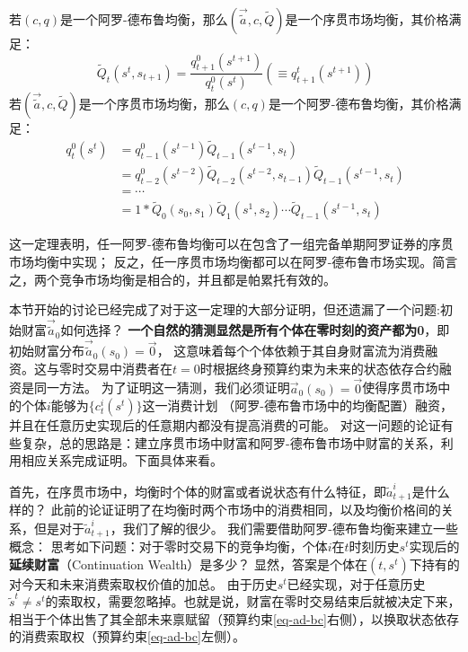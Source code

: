 \begin{theorem}
    若$\left(c,q\right)$是一个阿罗-德布鲁均衡，那么$(\vec{\tilde{a}},c,\tilde{Q})$是一个序贯市场均衡，其价格满足：
    \begin{equation}
        \tilde{Q}_t\left(s^t,s_{t+1}\right) = \frac{q_{t+1}^0\left(s^{t+1}\right)}{q_t^0\left(s^t\right)}
            (\equiv q_{t+1}^t\left(s^{t+1}\right))
    \end{equation}
    若$(\vec{\tilde{a}},c,\tilde{Q})$是一个序贯市场均衡，那么$\left(c,q\right)$是一个阿罗-德布鲁均衡，其价格满足：
    \begin{equation}
        \begin{aligned}
            q_{t}^0\left(s^{t}\right) &= q_{t-1}^0\left(s^{t-1}\right) \tilde{Q}_{t-1}\left(s^{t-1},s_{t}\right)  \\
                &= q_{t-2}^0\left(s^{t-2}\right)\tilde{Q}_{t-2}\left(s^{t-2},s_{t-1}\right)\tilde{Q}_{t-1}\left(s^{t-1},s_{t}\right) \\
                &= \cdots  \\
                &= 1*\tilde{Q}_0\left(s_0,s_1\right)\tilde{Q}_1\left(s^1,s_2\right)\cdots \tilde{Q}_{t-1}\left(s^{t-1},s_{t}\right)
        \end{aligned}
    \end{equation}
\end{theorem}

这一定理表明，任一阿罗-德布鲁均衡可以在包含了一组完备单期阿罗证券的序贯市场均衡中实现；
反之，任一序贯市场均衡都可以在阿罗-德布鲁市场实现。简言之，两个竞争市场均衡是相合的，并且都是帕累托有效的。

本节开始的讨论已经完成了对于这一定理的大部分证明，但还遗漏了一个问题:初始财富$\vec{\tilde{a}}_0$如何选择？
\textbf{一个自然的猜测显然是所有个体在零时刻的资产都为0}，即初始财富分布$\vec{\tilde{a}}_0\left(s_0\right)=\vec{0}$，
这意味着每个个体依赖于其自身财富流为消费融资。这与零时交易中消费者在$t=0$时根据终身预算约束为未来的状态依存合约融资是同一方法。
为了证明这一猜测，我们必须证明$\vec{a}_0\left(s_0\right)=\vec{0}$使得序贯市场中的个体$i$能够为$\{c_t^i\left(s^t\right)\}$这一消费计划
（阿罗-德布鲁市场中的均衡配置）融资，并且在任意历史实现后的任意期内都没有提高消费的可能。
对这一问题的论证有些复杂，总的思路是：建立序贯市场中财富和阿罗-德布鲁市场中财富的关系，利用相应关系完成证明。下面具体来看。

首先，在序贯市场中，均衡时个体的财富或者说状态有什么特征，即$\tilde{a}_{t+1}^i$是什么样的？
此前的论证证明了在均衡时两个市场中的消费相同，以及均衡价格间的关系，但是对于$\tilde{a}_{t+1}^i$，我们了解的很少。
我们需要借助阿罗-德布鲁均衡来建立一些概念：
思考如下问题：对于零时交易下的竞争均衡，个体$i$在$t$时刻历史$s^t$实现后的\textbf{延续财富}（Continuation Wealth）是多少？
显然，答案是个体在$(t,s^t)$下持有的对今天和未来消费索取权价值的加总。
由于历史$s^t$已经实现，对于任意历史$\tilde{s}^t \neq s^t$的索取权，需要忽略掉。也就是说，财富在零时交易结束后就被决定下来，
相当于个体出售了其全部未来禀赋留（预算约束\ref{eq-ad-bc}右侧），以换取状态依存的消费索取权（预算约束\ref{eq-ad-bc}左侧）。

